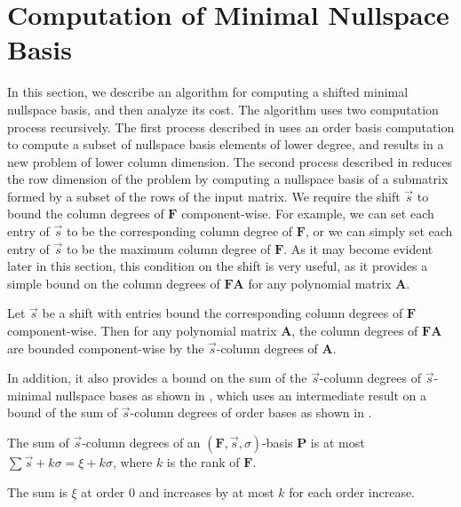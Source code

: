 
\section{Computation of Minimal Nullspace Basis}

\label{sec:Nullspace-Basis-Computation}

In this section, we describe an algorithm for computing a shifted
minimal nullspace basis, and then analyze its cost. The algorithm
uses two computation process recursively. The first process described
in  uses
an order basis computation to compute a subset of nullspace basis
elements of lower degree, and results in a new problem of lower column
dimension. The second process described in 
reduces the row dimension of the problem by computing a nullspace
basis of a submatrix formed by a subset of the rows of the input matrix.
We require the shift $\vec{s}$ to bound the column degrees of $\mathbf{F}$
component-wise. For example, we can set each entry of $\vec{s}$ to
be the corresponding column degree of $\mathbf{F}$, or we can simply
set each entry of $\vec{s}$ to be the maximum column degree of $\mathbf{F}$.
As it may become evident later in this section, this condition on
the shift is very useful, as it provides a simple bound on the column
degrees of $\mathbf{F}\mathbf{A}$ for any polynomial matrix $\mathbf{A}$.
\begin{lem}
\label{lem:boundOnDegreesOfFA}Let $\vec{s}$ be a shift with entries
bound the corresponding column degrees of $\mathbf{F}$ component-wise.
Then for any polynomial matrix $\mathbf{A}$, the column degrees of
$\mathbf{FA}$ are bounded component-wise by the $\vec{s}$-column
degrees of $\mathbf{A}$.
\end{lem}
In addition, it also provides a bound on the sum of the $\vec{s}$-column
degrees of $\vec{s}$-minimal nullspace bases as shown in ,
which uses an intermediate result on a bound of the sum of $\vec{s}$-column
degrees of order bases as shown in .
\begin{lem}
\label{lem:boundOfSumOfShiftedDegreesOfOrderBasis}The sum of $\vec{s}$-column
degrees of an $(\mathbf{F},\vec{s},\sigma)$-basis $\mathbf{P}$ is
at most $\sum\vec{s}+k\sigma=\xi+k\sigma$, where $k$ is the rank
of $\mathbf{F}$.\end{lem}
\begin{pf}
The sum is $\xi$ at order 0 and increases by at most $k$ for each
order increase.\end{pf}
